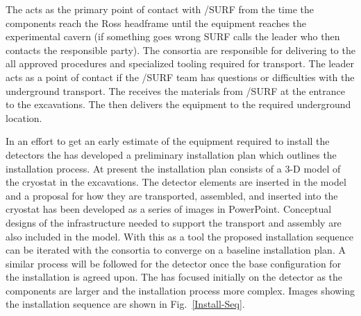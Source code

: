 The  acts as the primary point of contact with
/SURF from the time the components reach the Ross
headframe until the equipment reaches the experimental cavern (if
something goes wrong SURF calls the  leader who then
contacts the responsible party). The consortia are responsible for
delivering to the  all approved procedures and specialized
tooling required for transport. The  leader acts as a point
of contact if the /SURF team has questions or difficulties
with the underground transport.  The  receives the
materials from /SURF at the entrance to the 
excavations. The  then delivers the equipment to the
required underground location.

In an effort to get an early estimate of the equipment required to
install the detectors the  has developed a preliminary
installation plan which outlines the installation process. At present
the installation plan consists of a 3-D model of the cryostat in the
excavations. The  detector elements are inserted in the
model and a proposal for how they are transported, assembled, and
inserted into the cryostat has been developed as a series of images in
PowerPoint. Conceptual designs of the infrastructure needed to support
the transport and assembly are also included in the model. With this
as a tool the proposed installation sequence can be iterated with the
consortia to converge on a baseline installation plan. A similar
process will be followed for the  detector once the base
configuration for the  installation is agreed upon. The
 has focused initially on the  detector as the
 components are larger and the installation process more
complex. Images showing the  installation sequence are shown
in Fig.~\ref{Install-Seq}.
